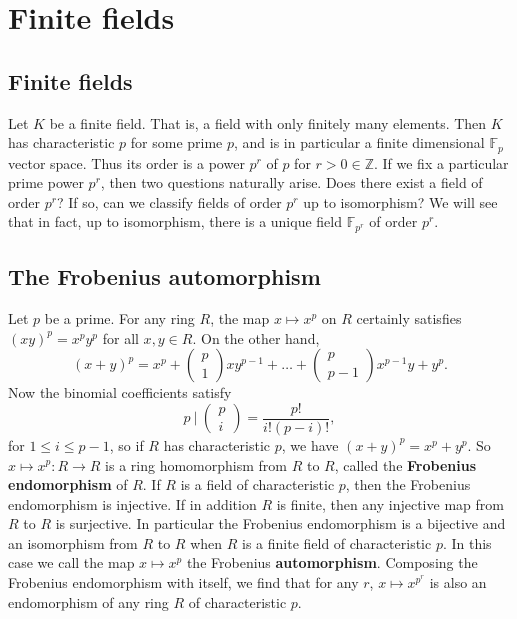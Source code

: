 \documentclass{article}
\newcommand{\F}{\mathbb{F}}
\newcommand{\Z}{\mathbb{Z}}
\newcommand{\rb}[1]{\left( #1 \right)}
\newcommand{\two}[2]{\begin{pmatrix} #1 \\ #2 \end{pmatrix}}
\theoremstyle{definition}\newtheorem{definition}{Definition}[subsection]
\theoremstyle{definition}\newtheorem{remark}[definition]{Remark}
\theoremstyle{definition}\newtheorem*{example}{Example}
\theoremstyle{definition}\newtheorem*{note}{Note}
\begin{document}

\section{Finite fields}

\subsection{Finite fields}

Let $ K $ be a finite field. That is, a field with only finitely many elements. Then $ K $ has characteristic $ p $ for some prime $ p $, and is in particular a finite dimensional $ \F_p $ vector space. Thus its order is a power $ p^r $ of $ p $ for $ r > 0 \in \Z $. If we fix a particular prime power $ p^r $, then two questions naturally arise. Does there exist a field of order $ p^r $? If so, can we classify fields of order $ p^r $ up to isomorphism? We will see that in fact, up to isomorphism, there is a unique field $ \F_{p^r} $ of order $ p^r $.

\subsection{The Frobenius automorphism}

Let $ p $ be a prime. For any ring $ R $, the map $ x \mapsto x^p $ on $ R $ certainly satisfies $ \rb{xy}^p = x^py^p $ for all $ x, y \in R $. On the other hand,
$$ \rb{x + y}^p = x^p + \two{p}{1}xy^{p - 1} + \dots + \two{p}{p - 1}x^{p - 1}y + y^p. $$
Now the binomial coefficients satisfy
$$ p \ \Bigg| \ \two{p}{i} = \dfrac{p!}{i!\rb{p - i}!}, $$
for $ 1 \le i \le p - 1 $, so if $ R $ has characteristic $ p $, we have $ \rb{x + y}^p = x^p + y^p $. So $ x \mapsto x^p : R \to R $ is a ring homomorphism from $ R $ to $ R $, called the \textbf{Frobenius endomorphism} of $ R $. If $ R $ is a field of characteristic $ p $, then the Frobenius endomorphism is injective. If in addition $ R $ is finite, then any injective map from $ R $ to $ R $ is surjective. In particular the Frobenius endomorphism is a bijective and an isomorphism from $ R $ to $ R $ when $ R $ is a finite field of characteristic $ p $. In this case we call the map $ x \mapsto x^p $ the Frobenius \textbf{automorphism}. Composing the Frobenius endomorphism with itself, we find that for any $ r $, $ x \mapsto x^{p^r} $ is also an endomorphism of any ring $ R $ of characteristic $ p $.
\end{document}
